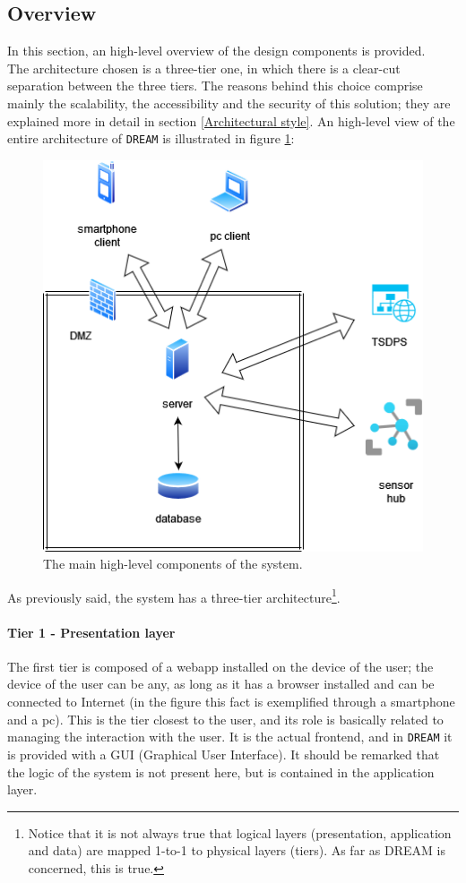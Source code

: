 \documentclass{article}
\begin{document}
\subsection{Overview}
In this section, an high-level overview of the design components is provided.\\
The architecture chosen is a three-tier one, in which there is a clear-cut separation between the three tiers. The reasons behind this choice comprise mainly the scalability, the accessibility and the security of this solution; they are explained more in detail in section \ref{Architectural style}.
An high-level view of the entire architecture of \verb|DREAM| is illustrated in figure \ref{fig:overview}:
\begin{figure}[H]
    \centering
    \includegraphics[scale=0.5]{diagrams/overview.png}
    \caption{The main high-level components of the system.}
    \label{fig:overview}
\end{figure}
As previously said, the system has a three-tier architecture\footnote{Notice that it is not always true that logical layers (presentation, application and data) are mapped 1-to-1 to physical layers (tiers). As far as DREAM is concerned, this is true.}.
\paragraph{Tier 1 - Presentation layer}
The first tier is composed of a webapp installed on the device of the user; the device of the user can be any, as long as it has a browser installed and can be connected to Internet (in the figure this fact is exemplified through a smartphone and a pc). This is the tier closest to the user, and its role is basically related to managing the interaction with the user. It is the actual frontend, and in \verb|DREAM| it is provided with a GUI (Graphical User Interface). It should be remarked that the logic of the system is not present here, but is contained in the application layer.
\end{document}
